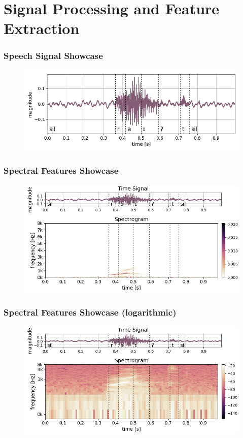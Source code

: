 
\section{Signal Processing and Feature Extraction}
\begin{frame}
  \frametitle{Speech Signal Showcase}
  \begin{figure} \includegraphics[width=1.0\textwidth]{../3_signal/figs/signal_raw_showcase_right0.png} \end{figure}
\end{frame}

\begin{frame}
  \frametitle{Spectral Features Showcase}
  \begin{figure} \includegraphics[width=1.0\textwidth]{../3_signal/figs/signal_spec-lin_showcase_right0.png} \end{figure}
\end{frame}

\begin{frame}
  \frametitle{Spectral Features Showcase (logarithmic)}
  \begin{figure} \includegraphics[width=1.0\textwidth]{../3_signal/figs/signal_spec-log_showcase_right0.png} \end{figure}
\end{frame}

